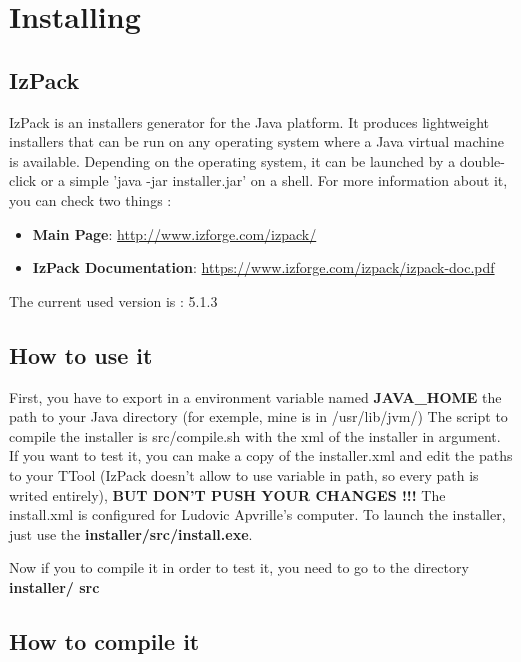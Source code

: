 \documentclass[12pt]{article}
\begin{document}
\newpage 

\section{Installing}
\subsection{IzPack}
IzPack is an installers generator for the Java platform. It produces lightweight installers that can be run on any operating system where a Java virtual machine is available. Depending on the operating system, it can be launched by a double-click or a simple 'java -jar installer.jar' on a shell.\newline
For more information about it, you can check two things :
\begin{itemize}
\item \textbf{Main Page}: \url{http://www.izforge.com/izpack/}
\item \textbf{IzPack Documentation}: \url{https://www.izforge.com/izpack/izpack-doc.pdf}
\end{itemize}

The current used version is : 5.1.3

\subsection{How to use it} 
First, you have to export in a environment variable named \textbf{JAVA\_HOME} the path
to your Java directory (for exemple, mine is in /usr/lib/jvm/)\newline \newline
The script to compile the installer is src/compile.sh with the xml of the
installer in argument.
If you want to test it, you can make a copy of the installer.xml and
edit the paths to your TTool (IzPack doesn't allow to use variable in path, so
every path is writed entirely), \textbf{BUT DON'T PUSH YOUR CHANGES !!!} The install.xml
is configured for Ludovic Apvrille's computer.\newline
To launch the installer, just use the \textbf{installer/src/install.exe}.\newline

Now if you to compile it in order to test it, you need to go to the directory \textbf{installer/ src}

\subsection{How to compile it}
\end{document}
